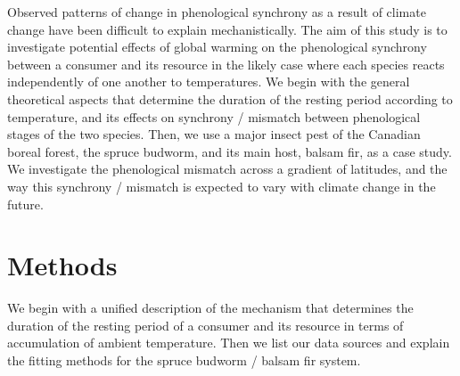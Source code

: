 \documentclass[12 pt]{article}
\begin{document}
Observed patterns of change in phenological synchrony as a result of climate change have been difficult to explain mechanistically. The aim of this study is to investigate potential effects of global warming on the phenological synchrony between a consumer and its resource in the likely case where each species reacts independently of one another to temperatures. We begin with the general theoretical aspects that determine the duration of the resting period according to temperature, and its effects on synchrony / mismatch between phenological stages of the two species. Then, we use a major insect pest of the Canadian boreal forest, the spruce budworm, and its main host, balsam fir, as a case study. We investigate the phenological mismatch across a gradient of latitudes, and the way this synchrony / mismatch is expected to vary with climate change in the future.\par

\section{Methods}
We begin with a unified description of the mechanism that determines the duration of the resting period of a consumer and its resource in terms of accumulation of ambient temperature. Then we list our data sources and explain the fitting methods for the spruce budworm / balsam fir system.  
\end{document}
